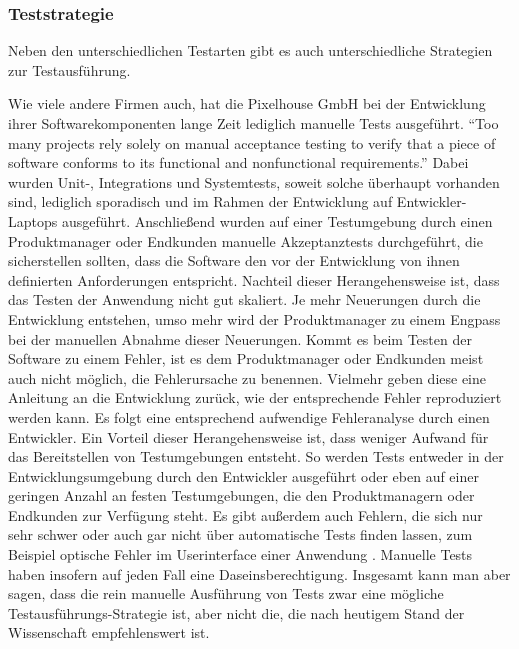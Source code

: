 \subsubsection{Teststrategie}

Neben den unterschiedlichen Testarten gibt es auch unterschiedliche Strategien zur Testausführung.

Wie viele andere Firmen auch, hat die Pixelhouse GmbH bei der Entwicklung ihrer Softwarekomponenten lange Zeit lediglich manuelle Tests ausgeführt. "`Too many projects rely solely on manual acceptance testing to verify that a piece of software conforms to its functional and nonfunctional requirements."' \citep[S.][S. 83]{HumFar10} Dabei wurden Unit-, Integrations und Systemtests, soweit solche überhaupt vorhanden sind, lediglich sporadisch und im Rahmen der Entwicklung auf Entwickler-Laptops ausgeführt. Anschließend wurden auf einer Testumgebung durch einen Produktmanager oder Endkunden manuelle Akzeptanztests durchgeführt, die sicherstellen sollten, dass die Software den vor der Entwicklung von ihnen definierten Anforderungen entspricht. Nachteil dieser Herangehensweise ist, dass das Testen der Anwendung nicht gut skaliert. Je mehr Neuerungen durch die Entwicklung entstehen, umso mehr wird der Produktmanager zu einem Engpass bei der manuellen Abnahme dieser Neuerungen. Kommt es beim Testen der Software zu einem Fehler, ist es dem Produktmanager oder Endkunden meist auch nicht möglich, die Fehlerursache zu benennen. Vielmehr geben diese eine Anleitung an die Entwicklung zurück, wie der entsprechende Fehler reproduziert werden kann. Es folgt eine entsprechend aufwendige Fehleranalyse durch einen Entwickler. Ein Vorteil dieser Herangehensweise ist, dass weniger Aufwand für das Bereitstellen von Testumgebungen entsteht. So werden Tests entweder in der Entwicklungsumgebung durch den Entwickler ausgeführt oder eben auf einer geringen Anzahl an festen Testumgebungen, die den Produktmanagern oder Endkunden zur Verfügung steht. Es gibt außerdem auch Fehlern, die sich nur sehr schwer oder auch gar nicht über automatische Tests finden lassen, zum Beispiel optische Fehler im Userinterface einer Anwendung \citep[Vgl.][S. 197]{DuvMatAnd07}. Manuelle Tests haben insofern auf jeden Fall eine Daseinsberechtigung. Insgesamt kann man aber sagen, dass die rein manuelle Ausführung von Tests zwar eine mögliche Testausführungs-Strategie ist, aber nicht die, die nach heutigem Stand der Wissenschaft empfehlenswert ist.

